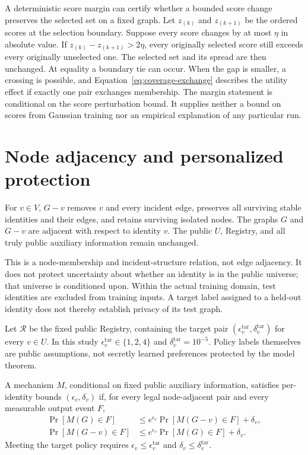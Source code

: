 A deterministic score margin can certify whether a bounded score change preserves the selected set on a fixed graph. Let $z_{(k)}$ and $z_{(k+1)}$ be the ordered scores at the selection boundary. Suppose every score changes by at most $\eta$ in absolute value. If $z_{(k)}-z_{(k+1)}>2\eta$, every originally selected score still exceeds every originally unselected one. The selected set and its spread are then unchanged. At equality a boundary tie can occur. When the gap is smaller, a crossing is possible, and Equation~\eqref{eq:coverage-exchange} describes the utility effect if exactly one pair exchanges membership. The margin statement is conditional on the score perturbation bound. It supplies neither a bound on scores from Gaussian training nor an empirical explanation of any particular run.

\section{Node adjacency and personalized protection}
\begin{definition}
For $v\in V$, $G-v$ removes $v$ and every incident edge, preserves all surviving stable identities and their edges, and retains surviving isolated nodes. The graphs $G$ and $G-v$ are adjacent with respect to identity $v$. The public $U$, Registry, and all truly public auxiliary information remain unchanged.
\end{definition}

This is a node-membership and incident-structure relation, not edge adjacency. It does not protect uncertainty about whether an identity is in the public universe; that universe is conditioned upon. Within the actual training domain, test identities are excluded from training inputs. A target label assigned to a held-out identity does not thereby establish privacy of its test graph.

Let $\mathcal{R}$ be the fixed public Registry, containing the target pair $(\epsilon^{\mathrm{tar}}_v,\delta^{\mathrm{tar}}_v)$ for every $v\in U$. In this study $\epsilon^{\mathrm{tar}}_v\in\{1,2,4\}$ and $\delta^{\mathrm{tar}}_v=10^{-5}$. Policy labels themselves are public assumptions, not secretly learned preferences protected by the model theorem.

\begin{definition}
A mechanism $M$, conditional on fixed public auxiliary information, satisfies per-identity bounds $(\epsilon_v,\delta_v)$ if, for every legal node-adjacent pair and every measurable output event $F$,
\begin{align}
 \Pr[M(G)\in F]&\leq e^{\epsilon_v}\Pr[M(G-v)\in F]+\delta_v,\\
 \Pr[M(G-v)\in F]&\leq e^{\epsilon_v}\Pr[M(G)\in F]+\delta_v.
\end{align}
Meeting the target policy requires $\epsilon_v\leq\epsilon^{\mathrm{tar}}_v$ and $\delta_v\leq\delta^{\mathrm{tar}}_v$.
\end{definition}


